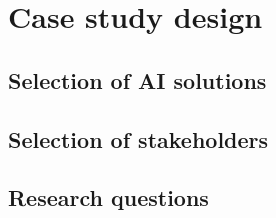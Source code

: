 \documentclass[a4paper,5p,review]{elsarticle}
\begin{document}



\section{Case study design}
\label{sec:CaseStudyDesign}



\subsection{Selection of AI solutions}



\subsection{Selection of stakeholders}


\subsection{Research questions}
\end{document}
